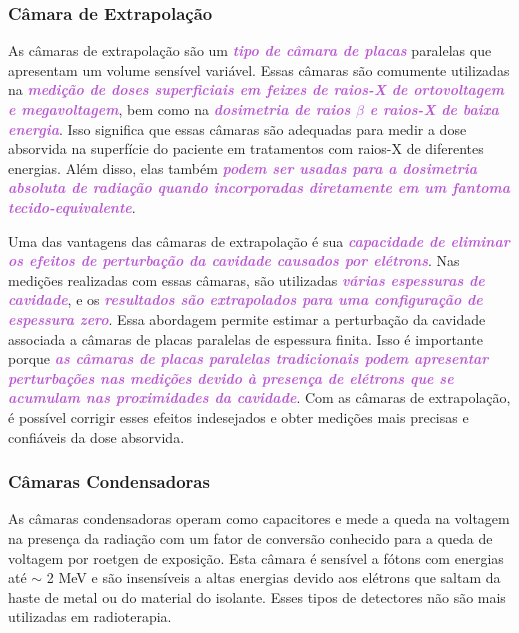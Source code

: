 \documentclass[11pt,a4paper]{article}
\begin{document}
\subsubsection*{Câmara de Extrapolação}

	As câmaras de extrapolação são um \textcolor{MediumOrchid}{\textit{\textbf{tipo de câmara de placas}}} paralelas que apresentam um volume sensível variável. Essas câmaras são comumente utilizadas na \textcolor{MediumOrchid}{\textit{\textbf{medição de doses superficiais em feixes de raios-X de ortovoltagem e megavoltagem}}}, bem como na \textcolor{MediumOrchid}{\textit{\textbf{dosimetria de raios $\beta$ e raios-X de baixa energia}}}. Isso significa que essas câmaras são adequadas para medir a dose absorvida na superfície do paciente em tratamentos com raios-X de diferentes energias. Além disso, elas também \textcolor{MediumOrchid}{\textit{\textbf{podem ser usadas para a dosimetria absoluta de radiação quando incorporadas diretamente em um fantoma tecido-equivalente}}}.

	Uma das vantagens das câmaras de extrapolação é sua \textcolor{MediumOrchid}{\textit{\textbf{capacidade de eliminar os efeitos de perturbação da cavidade causados por elétrons}}}. Nas medições realizadas com essas câmaras, são utilizadas \textcolor{MediumOrchid}{\textit{\textbf{várias espessuras de cavidade}}}, e os \textcolor{MediumOrchid}{\textit{\textbf{resultados são extrapolados para uma configuração de espessura zero}}}. Essa abordagem permite estimar a perturbação da cavidade associada a câmaras de placas paralelas de espessura finita. Isso é importante porque \textcolor{MediumOrchid}{\textit{\textbf{as câmaras de placas paralelas tradicionais podem apresentar perturbações nas medições devido à presença de elétrons que se acumulam nas proximidades da cavidade}}}. Com as câmaras de extrapolação, é possível corrigir esses efeitos indesejados e obter medições mais precisas e confiáveis da dose absorvida.


\subsubsection*{Câmaras Condensadoras}

	As câmaras condensadoras operam como capacitores e mede a queda na voltagem na presença da radiação com um fator de conversão conhecido para a queda de voltagem por roetgen de exposição. Esta câmara é sensível a fótons com energias até $\sim$ 2 MeV e são insensíveis a altas energias devido aos elétrons que saltam da haste de metal ou do material do isolante. Esses tipos de detectores não são mais utilizadas em radioterapia. 
\end{document}
